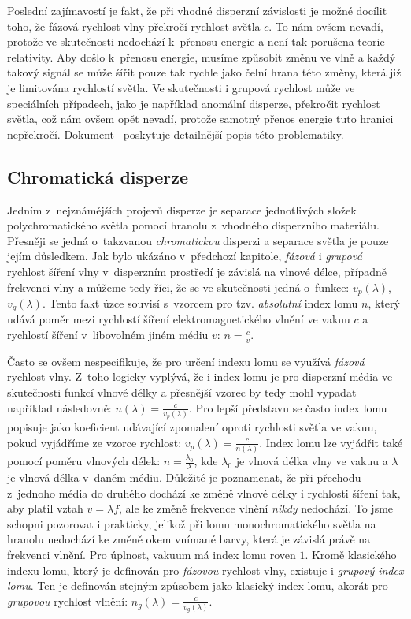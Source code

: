Poslední zajímavostí je fakt, že při vhodné
disperzní závislosti je možné docílit toho,
že fázová rychlost vlny překročí rychlost
světla $c$. To nám ovšem nevadí, protože
ve skutečnosti nedochází k~přenosu energie
a není tak porušena teorie relativity. Aby
došlo k~přenosu energie, musíme způsobit změnu
ve vlně a každý takový signál se může šířit
pouze tak rychle jako čelní hrana této změny,
která již je limitována rychlostí světla.
Ve skutečnosti i grupová rychlost může ve
speciálních případech, jako je například
anomální disperze, překročit rychlost světla,
což nám ovšem opět nevadí, protože samotný
přenos energie tuto hranici nepřekročí.
Dokument~\cite{harvard_disp} poskytuje
detailnější popis této problematiky.


\subsection{Chromatická disperze}
Jedním z~nejznámějších projevů disperze je
separace jednotlivých složek polychromatického
světla pomocí hranolu z~vhodného disperzního
materiálu. Přesněji se jedná o~takzvanou
\textit{chromatickou} disperzi a separace světla
je pouze jejím důsledkem. Jak bylo ukázáno
v~předchozí kapitole, \textit{fázová} i
\textit{grupová} rychlost šíření vlny v~disperzním
prostředí je závislá na vlnové délce, případně
frekvenci vlny a můžeme tedy říci, že se ve
skutečnosti jedná o~funkce:
$v_p(\lambda)$, $v_g(\lambda)$. 
Tento fakt úzce souvisí s~vzorcem pro tzv.
\textit{absolutní} index lomu $n$, který udává poměr
mezi rychlostí šíření elektromagnetického vlnění ve
vakuu $c$ a rychlostí šíření v~libovolném jiném médiu $v$:
$n = \frac{c}{v}$.

Často se ovšem nespecifikuje,
že pro určení indexu lomu se využívá \textit{fázová}
rychlost vlny. Z~toho logicky vyplývá, že i
index lomu je pro disperzní média ve skutečnosti
funkcí vlnové délky a přesnější vzorec by tedy
mohl vypadat například následovně: 
$n(\lambda) = \frac{c}{v_p(\lambda)}$.
Pro lepší představu se často index lomu popisuje
jako koeficient udávající zpomalení oproti rychlosti
světla ve vakuu, pokud vyjádříme ze vzorce rychlost:
$v_p(\lambda) = \frac{c}{n(\lambda)}$. Index lomu
lze vyjádřit také pomocí poměru vlnových délek:
$n = \frac{\lambda_0}{\lambda}$, kde $\lambda_0$
je vlnová délka vlny ve vakuu a $\lambda$ je vlnová
délka v~daném médiu. Důležité je poznamenat, že při
přechodu z~jednoho média do druhého dochází ke změně
vlnové délky i rychlosti šíření tak, aby platil
vztah $v = \lambda f$, ale ke změně frekvence
vlnění \textit{nikdy} nedochází. To jsme schopni
pozorovat i prakticky, jelikož při lomu
monochromatického světla na hranolu nedochází ke
změně okem vnímané barvy, která je závislá právě
na frekvenci vlnění. Pro úplnost, vakuum má index
lomu roven $1$. Kromě klasického indexu lomu,
který je definován pro \textit{fázovou} rychlost
vlny, existuje i \textit{grupový index lomu}. Ten
je definován stejným způsobem jako klasický index
lomu, akorát pro \textit{grupovou} rychlost vlnění:
$n_g(\lambda) = \frac{c}{v_g(\lambda)}$.


